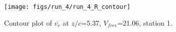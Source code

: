 \begin{figure}[H]
\centering
\texttt{[image: figs/run\_4/run\_4\_R\_contour]}
\caption{Contour plot of $\overline{v_{r}}$ at $z/c$=5.37, $V_{free}$=21.06, station 1.}
\label{fig:run_4_R_contour}
\end{figure}


